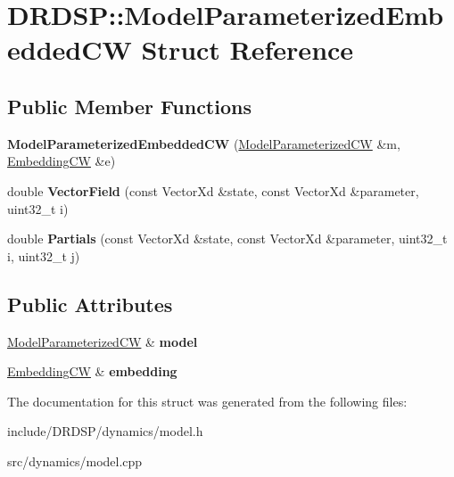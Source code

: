 \hypertarget{struct_d_r_d_s_p_1_1_model_parameterized_embedded_c_w}{\section{D\-R\-D\-S\-P\-:\-:Model\-Parameterized\-Embedded\-C\-W Struct Reference}
\label{struct_d_r_d_s_p_1_1_model_parameterized_embedded_c_w}
}
\subsection*{Public Member Functions}
\begin{DoxyCompactItemize}
\item 
\hypertarget{struct_d_r_d_s_p_1_1_model_parameterized_embedded_c_w_a4744a0ef259bc046f7f06f2d49ff4756}{{\bfseries Model\-Parameterized\-Embedded\-C\-W} (\hyperlink{struct_d_r_d_s_p_1_1_model_parameterized_c_w}{Model\-Parameterized\-C\-W} \&m, \hyperlink{struct_d_r_d_s_p_1_1_embedding_c_w}{Embedding\-C\-W} \&e)}\label{struct_d_r_d_s_p_1_1_model_parameterized_embedded_c_w_a4744a0ef259bc046f7f06f2d49ff4756}

\item 
\hypertarget{struct_d_r_d_s_p_1_1_model_parameterized_embedded_c_w_a7a798d3588c97da4596db6625111201c}{double {\bfseries Vector\-Field} (const Vector\-Xd \&state, const Vector\-Xd \&parameter, uint32\-\_\-t i)}\label{struct_d_r_d_s_p_1_1_model_parameterized_embedded_c_w_a7a798d3588c97da4596db6625111201c}

\item 
\hypertarget{struct_d_r_d_s_p_1_1_model_parameterized_embedded_c_w_a9dd7e110f102eac42adcbd79877cfbd6}{double {\bfseries Partials} (const Vector\-Xd \&state, const Vector\-Xd \&parameter, uint32\-\_\-t i, uint32\-\_\-t j)}\label{struct_d_r_d_s_p_1_1_model_parameterized_embedded_c_w_a9dd7e110f102eac42adcbd79877cfbd6}

\end{DoxyCompactItemize}
\subsection*{Public Attributes}
\begin{DoxyCompactItemize}
\item 
\hypertarget{struct_d_r_d_s_p_1_1_model_parameterized_embedded_c_w_a33c7f535c705ffc2d8fd30842757b093}{\hyperlink{struct_d_r_d_s_p_1_1_model_parameterized_c_w}{Model\-Parameterized\-C\-W} \& {\bfseries model}}\label{struct_d_r_d_s_p_1_1_model_parameterized_embedded_c_w_a33c7f535c705ffc2d8fd30842757b093}

\item 
\hypertarget{struct_d_r_d_s_p_1_1_model_parameterized_embedded_c_w_a38c7555dcaadd84066f2746b035d35c4}{\hyperlink{struct_d_r_d_s_p_1_1_embedding_c_w}{Embedding\-C\-W} \& {\bfseries embedding}}\label{struct_d_r_d_s_p_1_1_model_parameterized_embedded_c_w_a38c7555dcaadd84066f2746b035d35c4}

\end{DoxyCompactItemize}


The documentation for this struct was generated from the following files\-:\begin{DoxyCompactItemize}
\item 
include/\-D\-R\-D\-S\-P/dynamics/model.\-h\item 
src/dynamics/model.\-cpp\end{DoxyCompactItemize}
